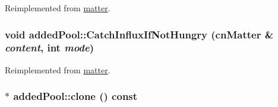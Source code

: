Reimplemented from \hyperlink{classmatter_abbc0846a0f37653351fbae149fbb91ce}{matter}.\hypertarget{classadded_pool_abe54b048d58a11fda014be4710031f56}{
\subsubsection[{CatchInfluxIfNotHungry}]{\setlength{\rightskip}{0pt plus 5cm}void addedPool::CatchInfluxIfNotHungry ({\bf cnMatter} \& {\em content}, \/  int {\em mode})}}
\label{classadded_pool_abe54b048d58a11fda014be4710031f56}


Reimplemented from \hyperlink{classmatter_af6764fccc5304bb9832879c40e7c7cba}{matter}.\hypertarget{classadded_pool_a6841609f3de8ac7a775bbd915eeaefdb}{
\subsubsection[{clone}]{ $\ast$ addedPool::clone () const}}
\label{classadded_pool_a6841609f3de8ac7a775bbd915eeaefdb}


